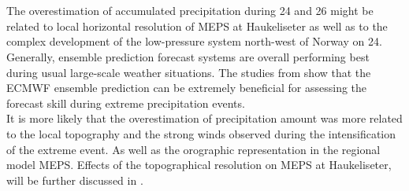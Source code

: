 \\
\\
The overestimation of accumulated precipitation during \num{24} and \SI{26}{\dec} might be related to
local horizontal resolution of MEPS at Haukeliseter as well as to the complex development of the low-pressure system north-west of Norway on \SI{24}{\dec}. 
\\
Generally, ensemble prediction forecast systems are overall performing best during usual large-scale weather situations. %
The studies from \citet{petroliagis_potential_1997,buizza_probabilistic_1999} show that the ECMWF ensemble prediction can be extremely beneficial for assessing the forecast skill during extreme precipitation events.
\\
It is more likely that the overestimation of precipitation amount was more related to the local topography and the strong winds observed during the intensification of the extreme event. As well as the orographic representation in the regional model MEPS. Effects of the topographical resolution on MEPS at Haukeliseter, will be further discussed in . 
